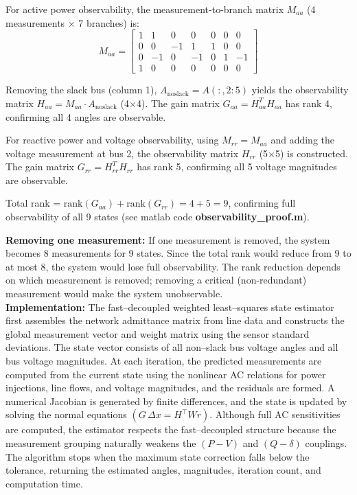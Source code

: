 \documentclass{article}
\begin{document}
For active power observability, the measurement-to-branch matrix $M_{aa}$ (4 measurements × 7 branches) is:
\[
M_{aa} = \begin{bmatrix}
1 & 1 & 0 & 0 & 0 & 0 & 0 \\
0 & 0 & -1 & 1 & 1 & 0 & 0 \\
0 & -1 & 0 & -1 & 0 & 1 & -1 \\
1 & 0 & 0 & 0 & 0 & 0 & 0
\end{bmatrix}
\]

Removing the slack bus (column 1), $A_{\text{noslack}} = A(:, 2:5)$ yields the observability matrix $H_{aa} = M_{aa} \cdot A_{\text{noslack}}$ (4×4). The gain matrix $G_{aa} = H_{aa}^T H_{aa}$ has rank 4, confirming all 4 angles are observable.

For reactive power and voltage observability, using $M_{rr} = M_{aa}$ and adding the voltage measurement at bus 2, the observability matrix $H_{rr}$ (5×5) is constructed. The gain matrix $G_{rr} = H_{rr}^T H_{rr}$ has rank 5, confirming all 5 voltage magnitudes are observable.

Total rank = $\text{rank}(G_{aa}) + \text{rank}(G_{rr}) = 4 + 5 = 9$, confirming full observability of all 9 states (see matlab code \textbf{observability\_proof.m}).

\textbf{Removing one measurement:} If one measurement is removed, the system becomes 8 measurements for 9 states. Since the total rank would reduce from 9 to at most 8, the system would lose full observability. The rank reduction depends on which measurement is removed; removing a critical (non-redundant) measurement would make the system unobservable.\\




\textbf{Implementation:} The fast--decoupled weighted least--squares state estimator first assembles the network admittance matrix from line data and constructs the global measurement vector and weight matrix using the sensor standard deviations. The state vector consists of all non--slack bus voltage angles and all bus voltage magnitudes. At each iteration, the predicted measurements are computed from the current state using the nonlinear AC relations for power injections, line flows, and voltage magnitudes, and the residuals are formed. A numerical Jacobian is generated by finite differences, and the state is updated by solving the normal equations $(G\,\Delta x = H^\top W r)$. Although full AC sensitivities are computed, the estimator respects the fast--decoupled structure because the measurement grouping naturally weakens the $(P\!-\!V)$ and $(Q\!-\!\delta)$ couplings. The algorithm stops when the maximum state correction falls below the tolerance, returning the estimated angles, magnitudes, iteration count, and computation time.
\end{document}
